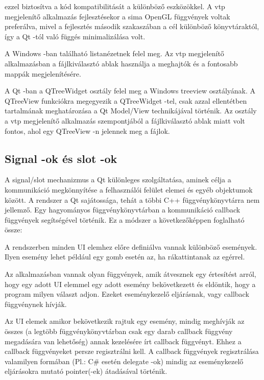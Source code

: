 \begin{sloppypar}
\begin{description}[font=\normalfont\itshape\space]
ezzel biztosítva a kód kompatibilitását a különböző eszközökkel. 
A vtp megjelenítő alkalmazás fejlesztésekor 
a sima OpenGL függvények voltak preferálva,
mivel a fejlesztés második szakaszában a cél különböző könyvtáraktól, 
így a Qt -tól való függés minimalizálása volt.
\item [QListWidget:] 
A Windows -ban található listanézetnek felel meg. 
Az vtp megjelenítő alkalmazásban 
a fájlkiválasztó ablak használja a meghajtók és 
a fontosabb mappák megjelenítésére.
\item [QTreeView:] 
A Qt -ban a {\ttfamily QTreeWidget} osztály felel meg 
a Windows treeview osztályának. 
A {\ttfamily QTreeView} funkciókra megegyezik a {\ttfamily QTreeWidget} -tel, 
csak azzal ellentétben tartalmának meghatározása 
a Qt Model/View technikájával történik. 
Az osztály a vtp megjelenítő alkalmazás szempontjából
a fájlkiválasztó ablak miatt volt fontos,
ahol egy {\ttfamily QTreeView} -n jelennek meg a fájlok.
\end{description}
\end{sloppypar}

\subsection{Signal -ok és slot -ok}

A signal/slot mechanizmus a Qt különleges szolgáltatása, 
aminek célja a kommunikáció megkönnyítése a felhasználói felület elemei
és egyéb objektumok között. 
A rendszer a Qt sajátossága, 
tehát a többi C++ függvénykönyvtárra nem jellemző.
Egy hagyományos függvénykönyvtárban a kommunikáció 
callback függvények segítségével történik. 
Ez a módszer a következőképpen foglalható össze:

A rendszerben minden UI elemhez előre definiálva vannak különböző események. 
Ilyen esemény lehet például egy gomb esetén az, 
ha rákattintanak az egérrel.

Az alkalmazásban vannak olyan függvények, 
amik átvesznek egy értesítést arról, 
hogy egy adott UI elemmel egy adott esemény bekövetkezett
és eldöntik, hogy a program milyen választ adjon. 
Ezeket eseménykezelő eljárásnak, vagy callback függvénynek hívják.

Az UI elemek amikor bekövetkezik rajtuk egy esemény, 
mindig meghívják az összes 
(a legtöbb függvénykönyvtárban csak egy darab callback függvény megadására van lehetőség) 
annak kezelésére írt callback függvényt. 
Ehhez a callback függvényeket persze regisztrálni kell.
A callback függvények regisztrálása 
valamilyen formában (Pl.: C\# esetén delegate -ok) 
mindig az eseménykezelő eljárásokra mutató pointer(-ek) átadásával történik.

